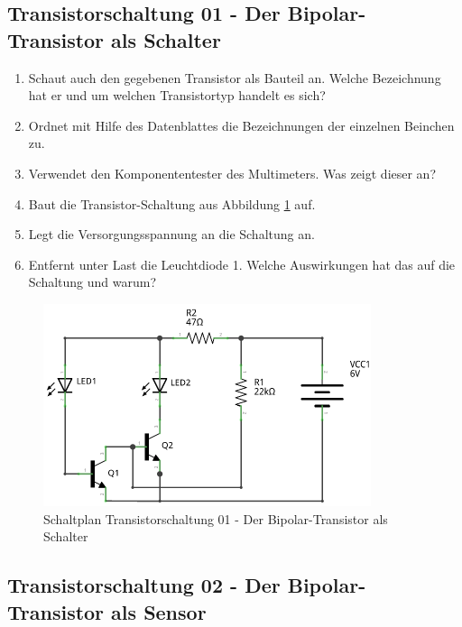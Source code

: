 \subsection*{Transistorschaltung 01 - Der Bipolar-Transistor als Schalter}

\begin{enumerate}
\itemsep1pt\parskip0pt
\item Schaut auch den gegebenen Transistor als Bauteil an. Welche Bezeichnung
  hat er und um welchen Transistortyp handelt es sich? 
\item Ordnet mit Hilfe des Datenblattes die Bezeichnungen der einzelnen Beinchen
  zu. 
\item Verwendet den Komponententester des Multimeters. Was zeigt dieser an?
\item Baut die Transistor-Schaltung aus Abbildung \ref{s01} auf.
\item Legt die Versorgungsspannung an die Schaltung an.
\item Entfernt unter Last die Leuchtdiode 1. Welche Auswirkungen hat das auf die Schaltung und warum?
\end{enumerate}

\begin{figure}[H]
	\centering
  \includegraphics[scale=1.4]{Transistor/Schaltungen/NotBeleuchtung_Schaltplan.pdf}
	\caption{Schaltplan Transistorschaltung 01 - Der Bipolar-Transistor als Schalter}
	\label{s01}
\end{figure}


\subsection*{Transistorschaltung 02 - Der Bipolar-Transistor als Sensor}

